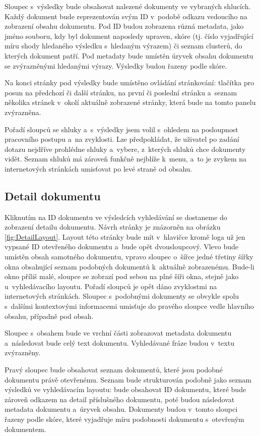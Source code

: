 Sloupec s~výsledky bude obsahovat nalezené dokumenty ve vybraných shlucích. Každý dokument bude reprezentován svým ID v~podobě odkazu vedoucího na zobrazení obsahu dokumentu. Pod ID budou zobrazena různá metadata, jako jméno souboru, kdy byl dokument naposledy upraven, skóre (tj. číslo vyjadřující míru shody hledaného výsledku s~hledaným výrazem) či seznam clusterů, do kterých dokument patří. Pod metadaty bude umístěn úryvek obsahu dokumentu se zvýrazněnými hledanými výrazy. Výsledky budou řazeny podle skóre.

Na konci stránky pod výsledky bude umístěno ovládání stránkování: tlačítka pro posun na předchozí či další stránku, na první či poslední stránku a~seznam několika stránek v~okolí aktuálně zobrazené stránky, která bude na tomto panelu zvýrazněna.

Pořadí sloupců se shluky a~s~výsledky jsem volil s~ohledem na posloupnost pracovního postupu a~na zvyklosti. Lze předpokládat, že uživatel po zadání dotazu nejdříve prohlédne shluky a~vybere, z~kterých shluků chce dokumenty vidět. Seznam shluků má zároveň funkčně nejblíže k~menu, a~to je zvykem na internetových stránkách umisťovat po levé straně od obsahu.

\subsection{Detail dokumentu}
Kliknutím na ID dokumentu ve výsledcích vyhledávání se dostaneme do zobrazení detailu dokumentu. Návrh stránky je znázorněn na obrázku \ref{fig:DetailLayout}. Layout této stránky bude mít v~hlavičce kromě loga už jen vypsané ID otevřeného dokumentu a~bude opět dvousloupcový. Vlevo bude umístěn obsah samotného dokumentu, vpravo sloupec o~šířce jedné třetiny šířky okna obsahující seznam podobných dokumentů k~aktuálně zobrazenému. Bude-li okno příliš malé, sloupce se zobrazí pod sebou na plné šíři okna, stejně jako u~vyhledávacího layoutu. Pořadí sloupců je opět dáno zvyklostmi na internetových stránkách. Sloupec s~podobnými dokumenty se obvykle spolu s~dalšími kontextovými informacemi umisťuje  do pravého sloupce vedle hlavního obsahu, případně pod obsah.

Sloupec s~obsahem bude ve vrchní části zobrazovat metadata dokumentu a~následovat bude celý text dokumentu. Vyhledávané fráze budou v~textu zvýrazněny.

Pravý sloupec bude obsahovat seznam dokumentů, které jsou podobné dokumentu právě otevřenému. Seznam bude strukturován podobně jako seznam výsledků ve vyhledávacím layoutu: bude obsahovat ID dokumentu, které bude zároveň odkazem na detail příslušného dokumentu, poté budou následovat metadata dokumentu a~úryvek obsahu. Dokumenty budou v~tomto sloupci řazeny podle skóre, které vyjadřuje míru podobnosti dokumentu s~otevřeným dokumentem.


